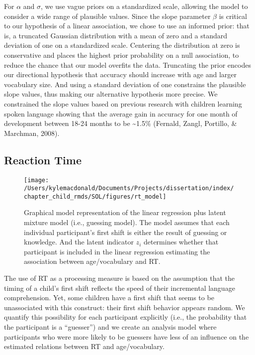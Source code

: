 \documentclass[oneside]{report}
\begin{document}
For \(\alpha\) and \(\sigma\), we use vague priors on a standardized
scale, allowing the model to consider a wide range of plausible values.
Since the slope parameter \(\beta\) is critical to our hypothesis of a
linear association, we chose to use an informed prior: that is, a
truncated Gaussian distribution with a mean of zero and a standard
deviation of one on a standardized scale. Centering the distribution at
zero is conservative and places the highest prior probability on a null
association, to reduce the chance that our model overfits the data.
Truncating the prior encodes our directional hypothesis that accuracy
should increase with age and larger vocabulary size. And using a
standard deviation of one constrains the plausible slope values, thus
making our alternative hypothesis more precise. We constrained the slope
values based on previous research with children learning spoken language
showing that the average gain in accuracy for one month of development
between 18-24 months to be \textasciitilde{}1.5\% (Fernald, Zangl,
Portillo, \& Marchman, 2008).

\subsection{Reaction Time}\label{reaction-time}
\begin{figure}[t]

{\centering \texttt{[image: /Users/kylemacdonald/Documents/Projects/dissertation/index/chapter\_child\_rmds/SOL/figures/rt\_model]} 

}

\caption[Graphical representation of the RT model.]{Graphical model representation of the linear regression plus latent mixture model (i.e., guessing model). The model assumes that each individual participant's first shift is either the result of guessing or knowledge. And the latent indicator $z_i$ determines whether that participant is included in the linear regression estimating the association between age/vocabulary and RT.}\label{fig:unnamed-chunk-8}
\end{figure}
The use of RT as a processing measure is based on the assumption that
the timing of a child's first shift reflects the speed of their
incremental language comprehension. Yet, some children have a first
shift that seems to be unassociated with this construct: their first
shift behavior appears random. We quantify this possibility for each
participant explicitly (i.e., the probability that the participant is a
``guesser'') and we create an analysis model where participants who were
more likely to be guessers have less of an influence on the estimated
relations between RT and age/vocabulary.
\end{document}
